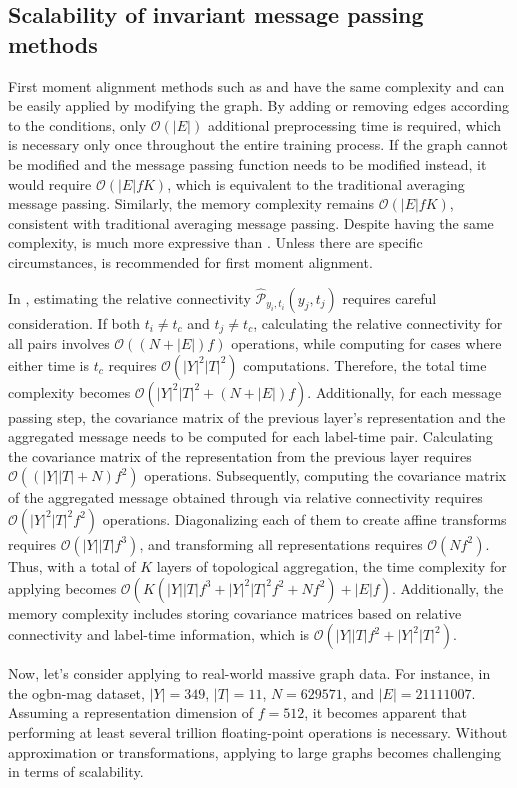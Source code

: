 \subsection{Scalability of invariant message passing methods}
\label{apdx:scalability}
First moment alignment methods such as \MMP and \PMP have the same complexity and can be easily applied by modifying the graph. By adding or removing edges according to the conditions, only $\mathcal{O}(|E|)$ additional preprocessing time is required, which is necessary only once throughout the entire training process. If the graph cannot be modified and the message passing function needs to be modified instead, it would require $\mathcal{O}(|E|fK)$, which is equivalent to the traditional averaging message passing. Similarly, the memory complexity remains $\mathcal{O}(|E|fK)$, consistent with traditional averaging message passing. Despite having the same complexity, \PMP is much more expressive than \MMP. Unless there are specific circumstances, \PMP is recommended for first moment alignment.

In \PNY, estimating the relative connectivity $\hat{\mathcal{P}}_{y_i, t_i}(y_j, t_j)$ requires careful consideration. If both $t_i\neq t_{c}$ and $t_j\neq t_{c}$, calculating the relative connectivity for all pairs involves $\mathcal{O}((N+|E|)f)$ operations, while computing for cases where either time is $t_{c}$ requires $\mathcal{O}(|Y|^2|T|^2)$ computations. Therefore, the total time complexity becomes $\mathcal{O}(|Y|^2|T|^2+(N+|E|)f)$. Additionally, for each message passing step, the covariance matrix of the previous layer's representation and the aggregated message needs to be computed for each label-time pair. Calculating the covariance matrix of the representation from the previous layer requires $\mathcal{O}((|Y||T|+N)f^2)$ operations. Subsequently, computing the covariance matrix of the aggregated message obtained through \PMP via relative connectivity requires $\mathcal{O}(|Y|^2|T|^2f^2)$ operations. Diagonalizing each of them to create affine transforms requires $\mathcal{O}(|Y||T|f^3)$, and transforming all representations requires $\mathcal{O}(Nf^2)$. Thus, with a total of $K$ layers of topological aggregation, the time complexity for applying \PNY becomes $\mathcal{O}(K(|Y||T|f^3+|Y|^2|T|^2f^2+Nf^2)+|E|f)$. Additionally, the memory complexity includes storing covariance matrices based on relative connectivity and label-time information, which is $\mathcal{O}(|Y||T|f^2 + |Y|^2|T|^2)$.

Now, let's consider applying \PNY to real-world massive graph data. For instance, in the ogbn-mag dataset, $|Y|=349$, $|T|=11$, $N=629571$, and $|E|=21111007$. Assuming a representation dimension of $f=512$, it becomes apparent that performing at least several trillion floating-point operations is necessary. Without approximation or transformations, applying \PNY to large graphs becomes challenging in terms of scalability.

